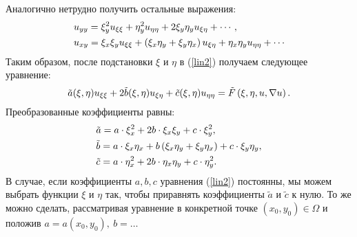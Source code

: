     Аналогично нетрудно получить остальные выражения:
    \begin{align*}
        & u_{yy} = \xi_y^2 u_{\xi\xi} + \eta_y^2 u_{\eta\eta} + 2 \xi_y\eta_y u_{\xi\eta} + \cdots,\\
        & u_{xy} = \xi_x\xi_y u_{\xi\xi} + \left({\xi_x\eta_y + \xi_y\eta_x}\right)u_{\xi\eta} + \eta_x\eta_yu_{\eta\eta} + \cdots
    \end{align*}
    Таким образом, после подстановки $\xi$ и $\eta$ в (\ref{lin2}) получаем следующее уравнение:
    \begin{equation*}
        \tilde{a}(\xi, \eta) u_{\xi\xi} + 2\tilde{b}(\xi, \eta)u_{\xi\eta} + \tilde{c}(\xi, \eta)u_{\eta\eta} = \tilde{F}\left({\xi, \eta, u, \nabla u}\right).
    \end{equation*}
    Преобразованные коэффициенты равны:
    \begin{align*}
        & \tilde{a} = a\cdot\xi_x^2 + 2b\cdot\xi_x\xi_y + c\cdot\xi_y^2,\\
        & \tilde{b} = a\cdot\xi_x\eta_x + b\left({\xi_x\eta_y +\xi_y\eta_x}\right) + c\cdot\xi_y\eta_y,\\
        & \tilde{c} = a\cdot\eta_x^2 + 2b\cdot\eta_x\eta_y + c\cdot\eta_y^2.
    \end{align*}
    В случае, если коэффициенты $a, b, c$ уравнения (\ref{lin2}) постоянны, мы можем выбрать функции $\xi$ и $\eta$ так, чтобы приравнять коэффициенты
    $\tilde{a}$ и $\tilde{c}$ к нулю. То же можно сделать, рассматривая уравнение в конкретной точке $(x_0, y_0) \in \Omega$ и положив
    $a = a(x_0,y_0),\: b = \ldots$